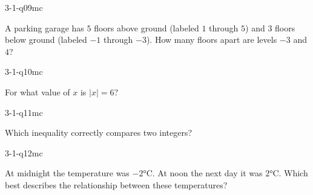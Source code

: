 \begin{practiceQuestion}{3-1-q09}{mc}
\begin{questionText}
A parking garage has $5$ floors above ground (labeled $1$ through $5$) and $3$ floors below ground (labeled $-1$ through $-3$). How many floors apart are levels $-3$ and $4$?
\end{questionText}
\end{practiceQuestion}

\begin{practiceQuestion}{3-1-q10}{mc}
\begin{questionText}
For what value of $x$ is $|x| = 6$?
\end{questionText}
\end{practiceQuestion}

\begin{practiceQuestion}{3-1-q11}{mc}
\begin{questionText}
Which inequality correctly compares two integers?
\end{questionText}
\end{practiceQuestion}

\begin{practiceQuestion}{3-1-q12}{mc}
\begin{questionText}
At midnight the temperature was $-2°$C. At noon the next day it was $2°$C. Which best describes the relationship between these temperatures?
\end{questionText}
\end{practiceQuestion}

